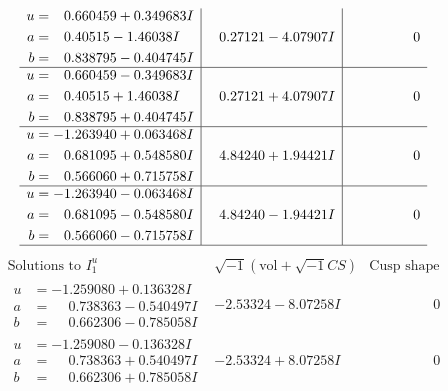 \documentclass[1p]{elsarticle_modified}
\theoremstyle{definition}
\newcommand{\I}{\sqrt{-1}}
\begin{document}
$$\begin{array}{c|c|c}
\begin{aligned}
u &= \phantom{-}0.660459 + 0.349683 I \\
a &= \phantom{-}0.40515 - 1.46038 I \\
b &= \phantom{-}0.838795 - 0.404745 I\end{aligned}
 & \phantom{-}0.27121 - 4.07907 I & \phantom{-0.000000 } 0 \\ \hline\begin{aligned}
u &= \phantom{-}0.660459 - 0.349683 I \\
a &= \phantom{-}0.40515 + 1.46038 I \\
b &= \phantom{-}0.838795 + 0.404745 I\end{aligned}
 & \phantom{-}0.27121 + 4.07907 I & \phantom{-0.000000 } 0 \\ \hline\begin{aligned}
u &= -1.263940 + 0.063468 I \\
a &= \phantom{-}0.681095 + 0.548580 I \\
b &= \phantom{-}0.566060 + 0.715758 I\end{aligned}
 & \phantom{-}4.84240 + 1.94421 I & \phantom{-0.000000 } 0 \\ \hline\begin{aligned}
u &= -1.263940 - 0.063468 I \\
a &= \phantom{-}0.681095 - 0.548580 I \\
b &= \phantom{-}0.566060 - 0.715758 I\end{aligned}
 & \phantom{-}4.84240 - 1.94421 I & \phantom{-0.000000 } 0\\
 \hline 
 \end{array}$$\newpage$$\begin{array}{c|c|c}  
\text{Solutions to }I^u_{1}& \I (\text{vol} + \sqrt{-1}CS) & \text{Cusp shape}\\
 \hline 
\begin{aligned}
u &= -1.259080 + 0.136328 I \\
a &= \phantom{-}0.738363 - 0.540497 I \\
b &= \phantom{-}0.662306 - 0.785058 I\end{aligned}
 & -2.53324 - 8.07258 I & \phantom{-0.000000 } 0 \\ \hline\begin{aligned}
u &= -1.259080 - 0.136328 I \\
a &= \phantom{-}0.738363 + 0.540497 I \\
b &= \phantom{-}0.662306 + 0.785058 I\end{aligned}
 & -2.53324 + 8.07258 I & \phantom{-0.000000 } 0 \\ \hline\begin{aligned}

\end{aligned}
\end{array}$$
\end{document}
